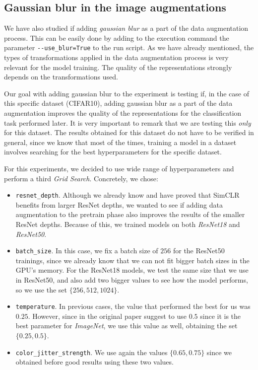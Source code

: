 \subsection{Gaussian blur in the image augmentations}
\label{exp3:adding:blur}

We have also studied if adding \emph{gaussian blur} as a part of the data augmentation process. This can be easily done by adding to the execution command the parameter \lstinline{--use_blur=True} to the run script. As we have already mentioned, the types of transformations applied in the data augmentation process is very relevant for the model training. The quality of the representations strongly depends on the transformations used.

Our goal with adding gaussian blur to the experiment is testing if, in the case of this specific dataset (CIFAR10), adding gaussian blur as a part of the data augmentation improves the quality of the representations for the classification task performed later. It is very important to remark that we are testing this \emph{only} for this dataset. The results obtained for this dataset do not have to be verified in general, since we know that most of the times, training a model in a dataset involves searching for the best hyperparameters for the specific dataset.

For this experiments, we decided to use wide range of hyperparameters and perform a third \emph{Grid Search}. Concretely, we chose:
\begin{itemize}
\item \lstinline{resnet_depth}. Although we already know and have proved that SimCLR benefits from larger ResNet depths, we wanted to see if adding data augmentation to the pretrain phase also improves the results of the smaller ResNet depths. Because of this, we trained models on both \emph{ResNet18} and \emph{ResNet50}.
\item \lstinline{batch_size}. In this case, we fix a batch size of $256$ for the ResNet50 trainings, since we already know that we can not fit bigger batch sizes in the GPU's memory. For the ResNet18 models, we test the same size that we use in ResNet50, and also add two bigger values to see how the model performs, so we use the set $\{256,512,1024\}$.
\item \lstinline{temperature}. In previous cases, the value that performed the best for us was $0.25$. However, since in the original paper suggest to use $0.5$ since it is the best parameter for \emph{ImageNet}, we use this value as well, obtaining the set $\{0.25,0.5\}$.
\item \lstinline{color_jitter_strength}. We use again the values $\{0.65,0.75\}$ since we obtained before good results using these two values.
\end{itemize}

